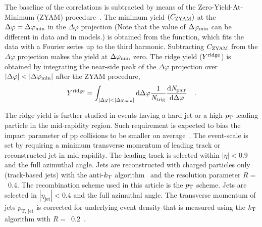 The baseline of the correlations is subtracted by means of the Zero-Yield-At-Minimum (ZYAM) procedure~\cite{Ajitanand:2005jj}. The minimum yield $(C_{\rm{ZYAM}})$ at the $\Delta\varphi=\Delta\varphi_{\rm{min}}$ in the $\Delta\varphi$ projection (Note that the value of $\Delta\varphi_{\rm{min}}$ can be different in data and in models.) is obtained from the function, which fits the data with a Fourier series up to the third harmonic. Subtracting $C_{\rm{ZYAM}}$ from the $\Delta\varphi$ projection makes the yield at $\Delta\varphi_{\rm{min}}$ zero. The ridge yield ($Y^{\rm{ridge}}$) is obtained by integrating the near-side peak of the $\Delta\varphi$ projection over $|\Delta\varphi|<|\Delta\varphi_{\rm{min}}|$ after the ZYAM procedure,
\begin{eqnarray}
Y^{\rm{ridge}} = \int_{|\Delta \varphi| < |\Delta\varphi_{\rm{min}}| } \rm{d} \Delta\varphi \frac{1}{\it{N}_{\rm{trig}}} \frac{ \rm{d}\it{}N_{\rm{pair}} }{ \rm{d}\Delta\varphi } \quad.
\end{eqnarray}

The ridge yield is further studied in events having a hard jet or a high-$p_\mathrm{T}$ leading particle in the mid-rapidity region. Such requirement is expected to bias the impact parameter of pp collisions to be smaller on average~\cite{Sjostrand:1986ep,Frankfurt:2010ea}.
The event-scale is set by requiring a minimum transverse momentum of leading track or reconstructed jet in mid-rapidity. The leading track is selected within $|\eta|<0.9$ and the full azimuthal angle. Jets are reconstructed with charged particles only (track-based jets) with the anti-$k_{\rm{T}}$ algorithm~\cite{Cacciari2008:FASTJET,Cacciari2012:FASTJET} and the resolution parameter $R=$~0.4. The recombination scheme used in this article is the $p_\mathrm{T}$ scheme. Jets are selected in $|\eta_\mathrm{jet}|<0.4$ and the full azimuthal angle. The transverse momentum of jets $p_\mathrm{T,\,jet}$ is corrected for underlying event density that is measured using the $k_{\rm{T}}$ algorithm with $R=$~0.2~\cite{ALICE2019:KTJETSub}. 

